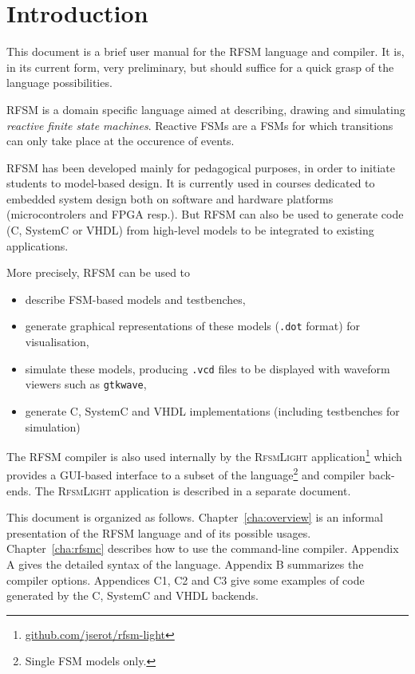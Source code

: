 \chapter{Introduction}
\label{chap:intro}

This document is a brief user manual for the RFSM language and compiler. It is, in its current form, very
preliminary, but should suffice for a quick grasp of the language possibilities. 

\medskip
RFSM is a domain specific language aimed at describing, drawing and simulating \emph{reactive finite state
  machines}. Reactive FSMs are a FSMs for which transitions can only take place at the occurence of
events.

\medskip
RFSM has been developed mainly for pedagogical purposes, in order to initiate students to
model-based design. It is currently used in courses dedicated to embedded system design both on
software and hardware platforms (microcontrolers and FPGA resp.). But RFSM can also be used to
generate code (C, SystemC or VHDL) from high-level models to be integrated to existing applications.

More precisely, RFSM can be used to
\begin{itemize}
\item describe FSM-based models and testbenches,
\item generate graphical representations of these models (\verb|.dot| format) for visualisation,
\item simulate these models, producing \verb|.vcd| files to be displayed with waveform viewers such
  as \texttt{gtkwave},
\item generate C, SystemC and VHDL implementations (including testbenches for simulation)
\end{itemize}

\medskip
The RFSM compiler is also used internally by the \textsc{RfsmLight}
application\footnote{\url{github.com/jserot/rfsm-light}} which provides a GUI-based interface to a
subset of the language\footnote{Single FSM models only.} and compiler back-ends. The
\textsc{RfsmLight} application is described in a separate document.

\medskip
This document is organized as follows.
Chapter~\ref{cha:overview} is an informal presentation of the RFSM language and of its
possible usages. Chapter~\ref{cha:rfsmc} describes how to use the command-line
compiler. Appendix A 
gives the detailed syntax of the language. Appendix B summarizes the compiler options. Appendices
C1, C2 and C3 give some examples of code generated by the C, SystemC and VHDL backends.

